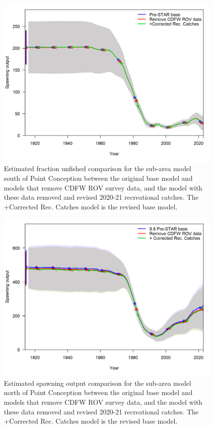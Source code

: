 \documentclass[
  letterpaper,
]{article}
\begin{document}
\pagebreak

\begin{figure}
\centering
\includegraphics[width=1\textwidth,height=1\textheight]{14.3_corrected_base_compare2_spawnbio_uncertainty.png}
\caption{Estimated fraction unfished comparison for the sub-area model south of Point Conception between the original base model and models that remove CDFW ROV survey data, and the model with these data removed and revised 2020-21 recreational catches. The +Corrected Rec. Catches model is the revised base model.\label{fig:south-depl}}
\end{figure}

\pagebreak

\begin{figure}
\centering
\includegraphics[width=1\textwidth,height=1\textheight]{9.10_corrected_base_compare2_spawnbio_uncertainty.png}
\caption{Estimated spawning output comparison for the sub-area model north of Point Conception between the original base model and models that remove CDFW ROV survey data, and the model with these data removed and revised 2020-21 recreational catches. The +Corrected Rec. Catches model is the revised base model.\label{fig:north-ssb}}
\end{figure}
\end{document}
